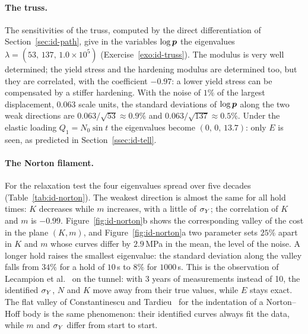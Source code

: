 \paragraph{The truss.}
The sensitivities of the truss, computed by the direct differentiation of
Section~\ref{sec:id-path}, give in the variables $\log\bm{p}$ the eigenvalues
$\lambda=(53,\,137,\,1.0\times10^5)$ (Exercise~\ref{exo:id-truss}). The modulus
is very well determined; the yield stress and the hardening modulus are
determined too, but they are correlated, with the coefficient $-0.97$: a lower
yield stress can be compensated by a stiffer hardening. With the noise of
$1\%$ of the largest displacement, $0.063$ scale units, the standard deviations
of $\log\bm{p}$ along the two weak directions are $0.063/\sqrt{53}\approx0.9\%$ and
$0.063/\sqrt{137}\approx0.5\%$. Under the elastic loading
$Q_1=N_0\sin t$ the eigenvalues become $(0,\,0,\,13.7)$: only $E$ is seen,
as predicted in Section~\ref{ssec:id-tell}.

\paragraph{The Norton filament.}
%
For the relaxation test the four eigenvalues spread over five decades
(Table~\ref{tab:id-norton}). The weakest direction is almost the same for all
hold times: $K$ decreases while $m$ increases, with a little of $\sigma_{Y}$; the
correlation of $K$ and $m$ is $-0.99$. Figure~\ref{fig:id-norton}b shows the
corresponding valley of the cost in the plane $(K,m)$, and
Figure~\ref{fig:id-norton}a two parameter sets $25\%$ apart in $K$ and $m$ whose
curves differ by $2.9$\,MPa in the mean, the level of the noise. A longer hold
raises the smallest eigenvalue: the standard deviation along the valley falls
from $34\%$ for a hold of $10$\,s to $8\%$ for $1000$\,s. This is the observation of
Lecampion et al.~\cite{LecampionConstantinescuNguyen2002} on the tunnel: with
3 years of measurements instead of 10, the identified $\sigma_{Y}$, $N$ and $K$ move
away from their true values, while $E$ stays exact. The flat valley of
Constantinescu and Tardieu~\cite{ConstantinescuTardieu2001b} for the
indentation of a Norton--Hoff body is the same phenomenon: their identified
curves always fit the data, while $m$ and $\sigma_{Y}$ differ from start to start.

